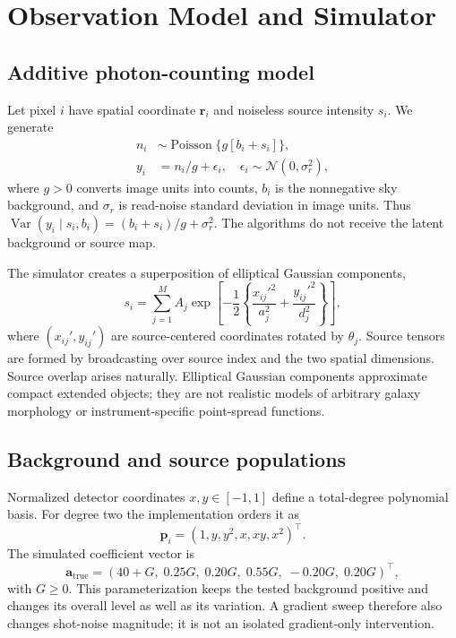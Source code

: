 \documentclass[conference]{IEEEtran}
\begin{document}
\section{Observation Model and Simulator}
\subsection{Additive photon-counting model}
Let pixel $i$ have spatial coordinate $\boldsymbol r_i$ and noiseless source intensity $s_i$. We generate
\begin{align}
 n_i &\sim \operatorname{Poisson}\{g[b_i+s_i]\},\\
 y_i &= n_i/g+\epsilon_i,\quad
 \epsilon_i\sim\mathcal N(0,\sigma_r^2),\label{eq:obs}
\end{align}
where $g>0$ converts image units into counts, $b_i$ is the nonnegative sky background, and $\sigma_r$ is read-noise standard deviation in image units. Thus $\operatorname{Var}(y_i\mid s_i,b_i)=(b_i+s_i)/g+\sigma_r^2$. The algorithms do not receive the latent background or source map.

The simulator creates a superposition of elliptical Gaussian components,
\begin{equation}
 s_i=\sum_{j=1}^{M} A_j\exp\left[-\frac12\left\{
 \frac{x_{ij}'^2}{a_j^2}+\frac{y_{ij}'^2}{d_j^2}\right\}\right],
\end{equation}
where $(x_{ij}',y_{ij}')$ are source-centered coordinates rotated by $\theta_j$. Source tensors are formed by broadcasting over source index and the two spatial dimensions. Source overlap arises naturally. Elliptical Gaussian components approximate compact extended objects; they are not realistic models of arbitrary galaxy morphology or instrument-specific point-spread functions.

\subsection{Background and source populations}
Normalized detector coordinates $x,y\in[-1,1]$ define a total-degree polynomial basis. For degree two the implementation orders it as
\begin{equation}
 \boldsymbol p_i=(1,y,y^2,x,xy,x^2)^\top.
\end{equation}
The simulated coefficient vector is
\begin{equation}
 \boldsymbol a_{\mathrm{true}}=
 (40+G,\;0.25G,\;0.20G,\;0.55G,\;-0.20G,\;0.20G)^\top,
\end{equation}
with $G\geq0$. This parameterization keeps the tested background positive and changes its overall level as well as its variation. A gradient sweep therefore also changes shot-noise magnitude; it is not an isolated gradient-only intervention.
\end{document}
